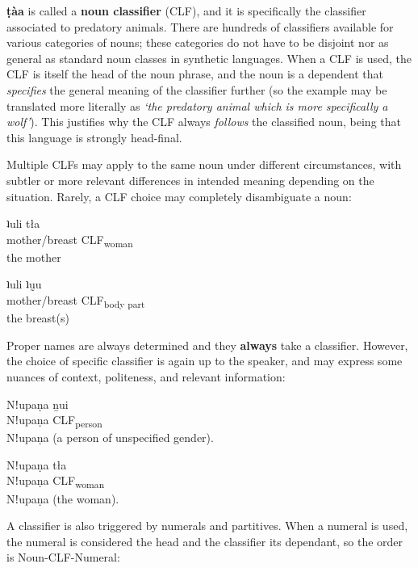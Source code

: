 \documentclass[11pt,a5paper]{book}
\newcommand{\qcn}[1]{\textcolor{AccentText}{\large\textbf{#1}}}
\newcommand{\grammsc}[1]{\textsc{#1}}
\newcommand{\CLF}[1]{\grammsc{CLF}\textsubscript{#1}}
\begin{document}
\qcn{ṭàa} is called a \textbf{noun classifier} (CLF), and it is specifically the classifier associated to predatory animals. There are hundreds of classifiers available for various categories of nouns; these categories do not have to be disjoint nor as general as standard noun classes in synthetic languages. When a CLF is used, the CLF is itself the head of the noun phrase, and the noun is a dependent that \emph{specifies} the general meaning of the classifier further (so the example may be translated more literally as \emph{`the predatory animal which is more specifically a wolf'}). This justifies why the CLF always \emph{follows} the classified noun, being that this language is strongly head-final.

Multiple CLFs may apply to the same noun under different circumstances, with subtler or more relevant differences in intended meaning depending on the situation. Rarely, a CLF choice may completely disambiguate a noun:

\begin{exe}
\ex
\gll ʇuli tła\\
mother/breast \CLF{woman}\\
\glt the mother
\end{exe}

\begin{exe}
\ex
\gll ʇuli ʇṵu\\
mother/breast \CLF{body part}\\
\glt the breast(s)
\end{exe}

Proper names are always determined and they \textbf{always} take a classifier. However, the choice of specific classifier is again up to the speaker, and may express some nuances of context, politeness, and relevant information:

\begin{exe}
\ex
\gll Nǃupaṇa ṉui\\
Nǃupaṇa 	\CLF{person}\\
\glt  Nǃupaṇa (a person of unspecified gender).
\end{exe}

\begin{exe}
\ex
\gll Nǃupaṇa 	tła\\
Nǃupaṇa 	\CLF{woman}\\
\glt Nǃupaṇa (the woman).
\end{exe}

A classifier is also triggered by numerals and partitives. When a numeral is used, the numeral is considered the head and the classifier its dependant, so the order is Noun-CLF-Numeral:
\end{document}
